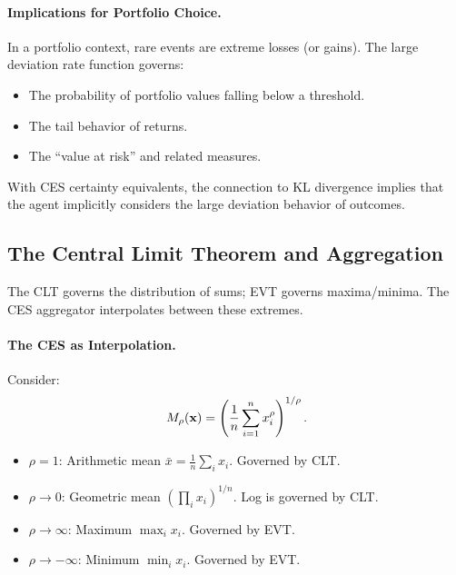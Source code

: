 \paragraph{Implications for Portfolio Choice.}
In a portfolio context, rare events are extreme losses (or gains). The large deviation rate function governs:
\begin{itemize}[nosep]
\item The probability of portfolio values falling below a threshold.
\item The tail behavior of returns.
\item The ``value at risk'' and related measures.
\end{itemize}

With CES certainty equivalents, the connection to KL divergence implies that the agent implicitly considers the large deviation behavior of outcomes.

\subsection{The Central Limit Theorem and Aggregation}
\label{subsec:ac-adv-clt}

The CLT governs the distribution of sums; EVT governs maxima/minima. The CES aggregator interpolates between these extremes.

\paragraph{The CES as Interpolation.}
Consider:
\begin{equation}
M_\rho(\mathbf{x}) = \left( \frac{1}{n} \sum_{i=1}^{n} x_i^\rho \right)^{1/\rho}.
\label{eq:ac-adv-M-rho}
\end{equation}

\begin{itemize}[nosep]
\item $\rho = 1$: Arithmetic mean $\bar{x} = \frac{1}{n} \sum_i x_i$. Governed by CLT.
\item $\rho \to 0$: Geometric mean $(\prod_i x_i)^{1/n}$. Log is governed by CLT.
\item $\rho \to \infty$: Maximum $\max_i x_i$. Governed by EVT.
\item $\rho \to -\infty$: Minimum $\min_i x_i$. Governed by EVT.
\end{itemize}

